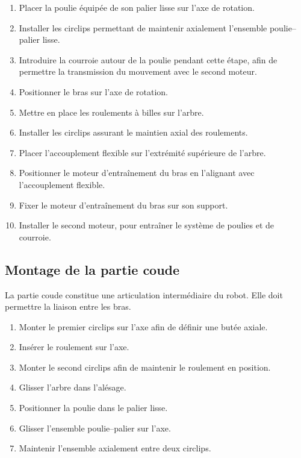 \begin{enumerate}

    \item Placer la poulie équipée de son palier lisse sur l'axe de rotation.

    \item Installer les circlips permettant de maintenir axialement l'ensemble poulie--palier lisse.

    \item Introduire la courroie autour de la poulie pendant cette étape, afin de permettre la transmission du mouvement avec le second moteur.

    \item Positionner le bras sur l'axe de rotation.

    \item Mettre en place les roulements à billes sur l'arbre.

    \item Installer les circlips assurant le maintien axial des roulements.

    \item Placer l'accouplement flexible sur l'extrémité supérieure de l'arbre.

    \item Positionner le moteur d'entraînement du bras en l'alignant avec l'accouplement flexible.

    \item Fixer le moteur d'entraînement du bras sur son support.

    \item Installer le second moteur, pour entraîner le système de poulies et de courroie.


\end{enumerate}

\subsection{Montage de la partie coude}
La partie coude constitue une articulation intermédiaire du robot. Elle doit permettre la liaison entre les bras.
\begin{enumerate}
    \item Monter le premier circlips sur l'axe afin de définir une butée axiale.
    \item Insérer le roulement sur l'axe.
    \item Monter le second circlips afin de maintenir le roulement en position.
    \item Glisser l'arbre dans l'alésage.
    \item Positionner la poulie dans le palier lisse.
    \item Glisser l'ensemble poulie--palier sur l'axe.
    \item Maintenir l'ensemble axialement entre deux circlips.
\end{enumerate}

